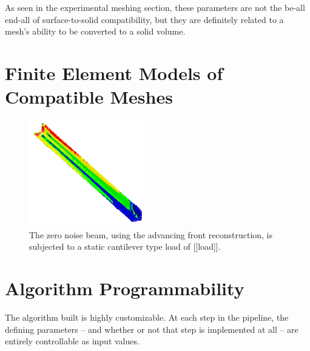 \documentclass[12pt]{drexelthesis}
\let\Oldsection\section
\renewcommand{\section}{\FloatBarrier\Oldsection}
\begin{document}
As seen in the experimental meshing section, these parameters are not the be-all end-all of surface-to-solid compatibility, but they are definitely related to a mesh's ability to be converted to a solid volume.

\section{Finite Element Models of Compatible Meshes}

\begin{figure}[!ht]
	\centering
		\includegraphics[width=2in]{conclusion/advancedfrontloading.png}
		\caption[FEA loading results on the zero noise beam]{\centering The zero noise beam, using the advancing front reconstruction, is subjected to a static cantilever type load of [[load]].}
	\label{conc:zeronoiseload}
\end{figure} 

\section{ Algorithm Programmability }

The algorithm built is highly customizable. At each step in the pipeline, the defining parameters -- and whether or not that step is implemented at all -- are entirely controllable as input values.
\end{document}
